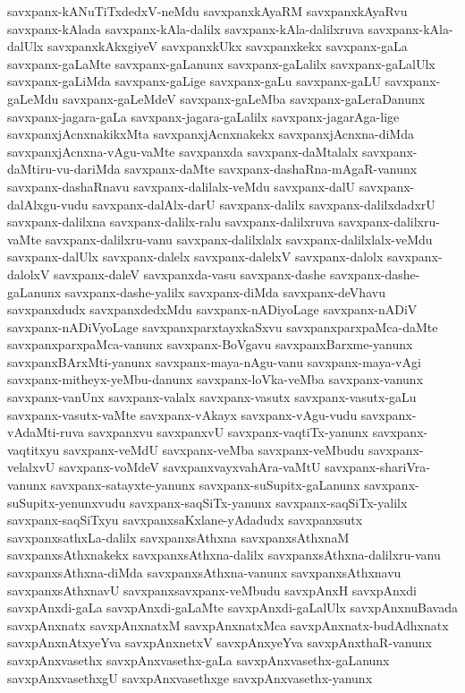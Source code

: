 {savxpanx-kANuTiTxdedxV-neMdu
savxpanxkAyaRM
savxpanxkAyaRvu
savxpanx-kAlada
savxpanx-kAla-dalilx
savxpanx-kAla-dalilxruva
savxpanx-kAla-dalUlx
savxpanxkAkxgiyeV
savxpanxkUkx
savxpanxkekx
savxpanx-gaLa
savxpanx-gaLaMte
savxpanx-gaLanunx
savxpanx-gaLalilx
savxpanx-gaLalUlx
savxpanx-gaLiMda
savxpanx-gaLige
savxpanx-gaLu
savxpanx-gaLU
savxpanx-gaLeMdu
savxpanx-gaLeMdeV
savxpanx-gaLeMba
savxpanx-gaLeraDanunx
savxpanx-jagara-gaLa
savxpanx-jagara-gaLalilx
savxpanx-jagarAga-lige
savxpanxjAcnxnakikxMta
savxpanxjAcnxnakekx
savxpanxjAcnxna-diMda
savxpanxjAcnxna-vAgu-vaMte
savxpanxda
savxpanx-daMtalalx
savxpanx-daMtiru-vu-dariMda
savxpanx-daMte
savxpanx-dashaRna-mAgaR-vanunx
savxpanx-dashaRnavu
savxpanx-dalilalx-veMdu
savxpanx-dalU
savxpanx-dalAlxgu-vudu
savxpanx-dalAlx-darU
savxpanx-dalilx
savxpanx-dalilxdadxrU
savxpanx-dalilxna
savxpanx-dalilx-ralu
savxpanx-dalilxruva
savxpanx-dalilxru-vaMte
savxpanx-dalilxru-vanu
savxpanx-dalilxlalx
savxpanx-dalilxlalx-veMdu
savxpanx-dalUlx
savxpanx-dalelx
savxpanx-dalelxV
savxpanx-dalolx
savxpanx-dalolxV
savxpanx-daleV
savxpanxda-vasu
savxpanx-dashe
savxpanx-dashe-gaLanunx
savxpanx-dashe-yalilx
savxpanx-diMda
savxpanx-deVhavu
savxpanxdudx
savxpanxdedxMdu
savxpanx-nADiyoLage
savxpanx-nADiV
savxpanx-nADiVyoLage
savxpanxparxtayxkaSxvu
savxpanxparxpaMca-daMte
savxpanxparxpaMca-vanunx
savxpanx-BoVgavu
savxpanxBarxme-yanunx
savxpanxBArxMti-yanunx
savxpanx-maya-nAgu-vanu
savxpanx-maya-vAgi
savxpanx-mitheyx-yeMbu-danunx
savxpanx-loVka-veMba
savxpanx-vanunx
savxpanx-vanUnx
savxpanx-valalx
savxpanx-vasutx
savxpanx-vasutx-gaLu
savxpanx-vasutx-vaMte
savxpanx-vAkayx
savxpanx-vAgu-vudu
savxpanx-vAdaMti-ruva
savxpanxvu
savxpanxvU
savxpanx-vaqtiTx-yanunx
savxpanx-vaqtitxyu
savxpanx-veMdU
savxpanx-veMba
savxpanx-veMbudu
savxpanx-velalxvU
savxpanx-voMdeV
savxpanxvayxvahAra-vaMtU
savxpanx-shariVra-vanunx
savxpanx-satayxte-yanunx
savxpanx-suSupitx-gaLanunx
savxpanx-suSupitx-yenunxvudu
savxpanx-saqSiTx-yanunx
savxpanx-saqSiTx-yalilx
savxpanx-saqSiTxyu
savxpanxsaKxlane-yAdadudx
savxpanxsutx
savxpanxsathxLa-dalilx
savxpanxsAthxna
savxpanxsAthxnaM
savxpanxsAthxnakekx
savxpanxsAthxna-dalilx
savxpanxsAthxna-dalilxru-vanu
savxpanxsAthxna-diMda
savxpanxsAthxna-vanunx
savxpanxsAthxnavu
savxpanxsAthxnavU
savxpanxsavxpanx-veMbudu
savxpAnxH
savxpAnxdi
savxpAnxdi-gaLa
savxpAnxdi-gaLaMte
savxpAnxdi-gaLalUlx
savxpAnxnuBavada
savxpAnxnatx
savxpAnxnatxM
savxpAnxnatxMca
savxpAnxnatx-budAdhxnatx
savxpAnxnAtxyeYva
savxpAnxnetxV
savxpAnxyeYva
savxpAnxthaR-vanunx
savxpAnxvasethx
savxpAnxvasethx-gaLa
savxpAnxvasethx-gaLanunx
savxpAnxvasethxgU
savxpAnxvasethxge
savxpAnxvasethx-yanunx
}

